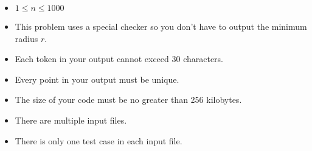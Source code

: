 \begin{itemize}
\tightlist
\item $1\le n\le 1000$
\item This problem uses a special checker so you don't have to 
      output the minimum radius $r$. 
\item Each token in your output cannot exceed 30 characters.
\item Every point in your output must be unique.
\item The size of your code must be no greater than 256 kilobytes.
\item There are multiple input files.
\item There is only one test case in each input file.
\end{itemize}
